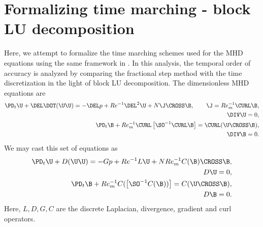 \documentclass[landscape]{article}
\newcommand{\ReInv}{Re^{-1}}
\newcommand{\RemInv}{Re_m^{-1}}
\newcommand{\Al}{N Re_m^{-1}}
\newcommand{\Interaction}{N}
\begin{document}
\doublespacing
\MOONSTITLE

\section{Formalizing time marching - block LU decomposition}
Here, we attempt to formalize the time marching schemes used for the MHD equations using the same framework in \cite{Perot1993}. In this analysis, the temporal order of accuracy is analyzed by comparing the fractional step method with the time discretization in the light of block LU decomposition. The dimensionless MHD equations are
\begin{equation}\begin{aligned}
\PD_t \U + \DEL \DOT (\U \U) = - \DEL p + \ReInv \DEL^2 \U + \Interaction \J \CROSS \B, \qquad \J = \RemInv \CURL \B, \\
 \DIV \U = 0, \\
\PD_t \B + \RemInv \CURL \left[ \SO^{-1} \CURL \B \right] = \CURL (\U \CROSS \B), \\
 \DIV \B = 0.
\end{aligned} \end{equation}
We may cast this set of equations as
\begin{equation}\begin{aligned}
\PD_t \U + D (\U \U) = - G p + \ReInv L \U + \Al C(\B) \CROSS \B, \\
 D \U = 0, \\
\PD_t \B + \RemInv C (\left[ \SO^{-1} C(\B)) \right] = C (\U \CROSS \B), \\
 D \B = 0.
\end{aligned} \end{equation}
Here, $L,D,G,C$ are the discrete Laplacian, divergence, gradient and curl operators.

\newpage
\end{document}
